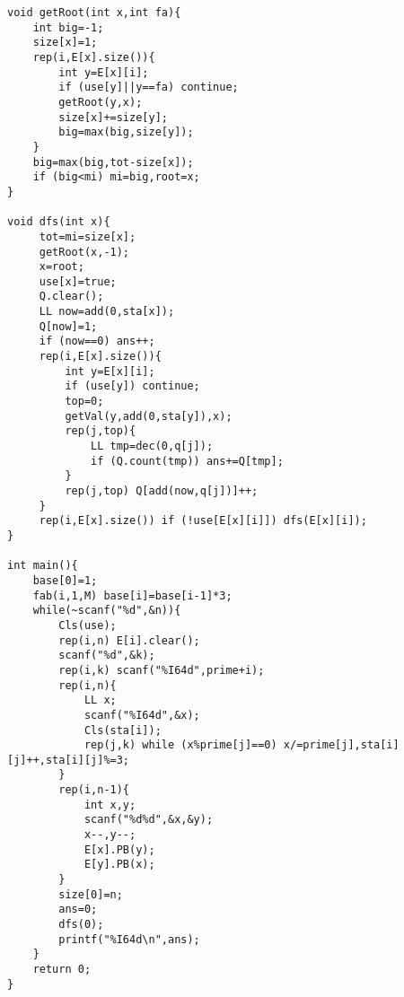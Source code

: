 \begin{verbatim}
void getRoot(int x,int fa){
    int big=-1;
    size[x]=1;
    rep(i,E[x].size()){
        int y=E[x][i];
        if (use[y]||y==fa) continue;
        getRoot(y,x);
        size[x]+=size[y];
        big=max(big,size[y]);
    }
    big=max(big,tot-size[x]);
    if (big<mi) mi=big,root=x;
}

void dfs(int x){
     tot=mi=size[x];
     getRoot(x,-1);
     x=root;
     use[x]=true;
     Q.clear();
     LL now=add(0,sta[x]);
     Q[now]=1;
     if (now==0) ans++;
     rep(i,E[x].size()){
         int y=E[x][i];
         if (use[y]) continue;
         top=0;
         getVal(y,add(0,sta[y]),x);
         rep(j,top){
             LL tmp=dec(0,q[j]);
             if (Q.count(tmp)) ans+=Q[tmp];
         }
         rep(j,top) Q[add(now,q[j])]++;
     }
     rep(i,E[x].size()) if (!use[E[x][i]]) dfs(E[x][i]);
}

int main(){
    base[0]=1;
    fab(i,1,M) base[i]=base[i-1]*3;
    while(~scanf("%d",&n)){
        Cls(use);
        rep(i,n) E[i].clear();
        scanf("%d",&k);
        rep(i,k) scanf("%I64d",prime+i);
        rep(i,n){
            LL x;
            scanf("%I64d",&x);
            Cls(sta[i]);
            rep(j,k) while (x%prime[j]==0) x/=prime[j],sta[i][j]++,sta[i][j]%=3;
        }
        rep(i,n-1){
            int x,y;
            scanf("%d%d",&x,&y);
            x--,y--;
            E[x].PB(y);
            E[y].PB(x);
        }
        size[0]=n;
        ans=0;
        dfs(0);
        printf("%I64d\n",ans);
    }
    return 0;
}
\end{verbatim}
